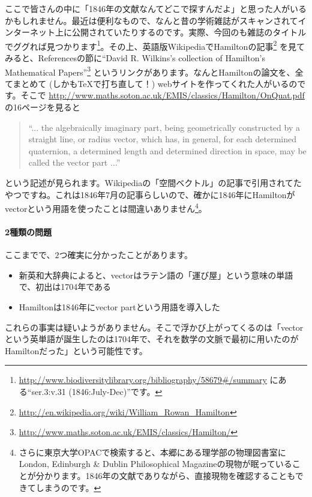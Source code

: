 ここで皆さんの中に「1846年の文献なんてどこで探すんだよ」と思った人がいるかもしれません。最近は便利なもので、なんと昔の学術雑誌がスキャンされてインターネット上に公開されていたりするのです。実際、今回のも雑誌のタイトルでググれば見つかります\footnote{\url{http://www.biodiversitylibrary.org/bibliography/58679\#/summary} にある``ser.3:v.31 (1846:July-Dec)''です。}。その上、英語版WikipediaでHamiltonの記事\footnote{\url{http://en.wikipedia.org/wiki/William_Rowan_Hamilton}} を見てみると、Referencesの節に``David R. Wilkins's collection of Hamilton's Mathematical Papers''\footnote{\url{http://www.maths.soton.ac.uk/EMIS/classics/Hamilton/}} というリンクがあります。なんとHamiltonの論文を、全てまとめて (しかも\TeX で打ち直して！\negthinspace) webサイトを作ってくれた人がいるのです。そこで \url{http://www.maths.soton.ac.uk/EMIS/classics/Hamilton/OnQuat.pdf} の16ページを見ると
\begin{quotation}
``... the algebraically imaginary part, being geometrically constructed by a straight line, or radius vector, which has, in general, for each determined quaternion, a determined length and determined direction in space, may be called the vector part ...''
\end{quotation}
という記述が見られます。Wikipediaの「空間ベクトル」の記事で引用されてたやつですね。これは1846年7月の記事らしいので、確かに1846年にHamiltonがvectorという用語を使ったことは間違いありません\footnote{さらに東京大学OPACで検索すると、本郷にある理学部の物理図書室にLondon, Edinburgh \& Dublin Philosophical Magazineの現物が眠っていることが分かります。1846年の文献でありながら、直接現物を確認することもできてしまうのです。}。

\paragraph{2種類の問題}

ここまでで、$2$つ確実に分かったことがあります。\vspace{-0.5zw}
\begin{itemize}
\item 新英和大辞典によると、vectorはラテン語の「運び屋」という意味の単語で、初出は1704年である
\item Hamiltonは1846年にvector partという用語を導入した
\end{itemize}\vspace{-0.5zw}
これらの事実は疑いようがありません。そこで浮かび上がってくるのは「vectorという英単語が誕生したのは1704年で、それを数学の文脈で最初に用いたのがHamiltonだった」という可能性です。

